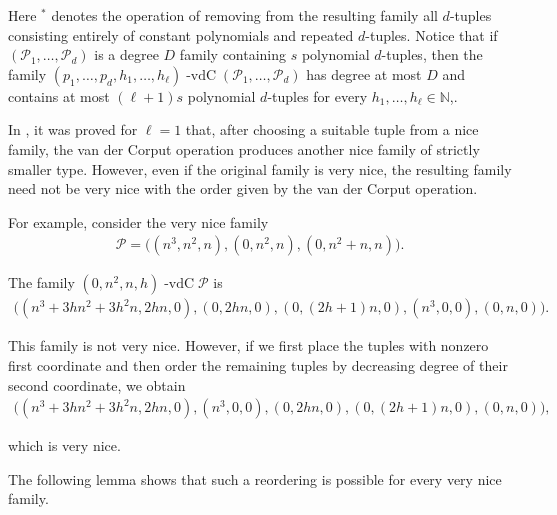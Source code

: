 \documentclass[11pt,reqno]{amsart}
\newcommand{\N}{\mathbb{N}}
\newcommand{\cP}{{\mathcal P}}
\DeclareMathOperator{\vdc}{-vdC}
\theoremstyle{definition}
\theoremstyle{remark}
\begin{document}
 Here $^*$ denotes the operation of removing from the resulting family all $d$-tuples consisting entirely of constant polynomials and repeated $d$-tuples. Notice that if $(\cP_1,\ldots, \cP_d)$ is a degree $D$ family containing $s$ polynomial $d$-tuples, then the family $(p_1,\ldots, p_d,h_1,\dots,h_\ell)\vdc(\cP_1,\ldots, \cP_d)$ has degree at most $D$ and contains at most $(\ell+1)s$ polynomial $d$-tuples for every $h_1,\dots,h_\ell\in\N$,.

In \cite[Lemma 5.4]{Chu_Frantzikinakis_Host_ergodic_averages_distinct_degree:2011}, it was proved for $\ell=1$ that, after choosing a suitable tuple from a nice family, the van der Corput operation produces another nice family of strictly smaller type. However, even if the original family is very nice, the resulting family need not be very nice with the order given by the van der Corput operation.

For example, consider the very nice family\begin{align*}
    \cP=\big( (n^3,n^2,n),(0,n^2,n),(0,n^2+n,n) \big).
\end{align*}

The family $(0,n^2,n,h)\vdc \cP$ is \begin{align*}
    \big( (n^3+3hn^2+3h^2n,2hn,0),(0,2hn,0),(0,(2h+1)n,0),(n^3,0,0),(0,n,0) \big).
\end{align*}

This family is not very nice. However, if we first place the tuples with nonzero first coordinate and then order the remaining tuples by decreasing degree of their second coordinate, we obtain\begin{align*}
    \big( (n^3+3hn^2+3h^2n,2hn,0),(n^3,0,0),(0,2hn,0),(0,(2h+1)n,0),(0,n,0) \big),
\end{align*}

which is very nice.

The following lemma shows that such a reordering is possible for every very nice family.
\end{document}

